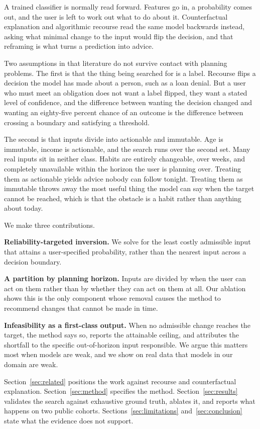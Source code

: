 \documentclass[conference]{IEEEtran}
\begin{document}
A trained classifier is normally read forward. Features go in, a probability
comes out, and the user is left to work out what to do about it. Counterfactual
explanation and algorithmic recourse read the same model backwards instead,
asking what minimal change to the input would flip the decision, and that
reframing is what turns a prediction into advice.

Two assumptions in that literature do not survive contact with planning
problems. The first is that the thing being searched for is a label. Recourse
flips a decision the model has made about a person, such as a loan denial. But a
user who must meet an obligation does not want a label flipped, they want a
stated level of confidence, and the difference between wanting the decision
changed and wanting an eighty-five percent chance of an outcome is the
difference between crossing a boundary and satisfying a threshold.

The second is that inputs divide into actionable and immutable. Age is
immutable, income is actionable, and the search runs over the second set. Many
real inputs sit in neither class. Habits are entirely changeable, over weeks,
and completely unavailable within the horizon the user is planning over.
Treating them as actionable yields advice nobody can follow tonight. Treating
them as immutable throws away the most useful thing the model can say when the
target cannot be reached, which is that the obstacle is a habit rather than
anything about today.

We make three contributions.

\textbf{Reliability-targeted inversion.} We solve for the least costly
admissible input that attains a user-specified probability, rather than the
nearest input across a decision boundary.

\textbf{A partition by planning horizon.} Inputs are divided by when the user
can act on them rather than by whether they can act on them at all. Our ablation
shows this is the only component whose removal causes the method to recommend
changes that cannot be made in time.

\textbf{Infeasibility as a first-class output.} When no admissible change
reaches the target, the method says so, reports the attainable ceiling, and
attributes the shortfall to the specific out-of-horizon input responsible. We
argue this matters most when models are weak, and we show on real data that
models in our domain are weak.

Section~\ref{sec:related} positions the work against recourse and counterfactual
explanation. Section~\ref{sec:method} specifies the method.
Section~\ref{sec:results} validates the search against exhaustive ground truth,
ablates it, and reports what happens on two public cohorts.
Sections~\ref{sec:limitations} and~\ref{sec:conclusion} state what the evidence
does not support.
\end{document}
